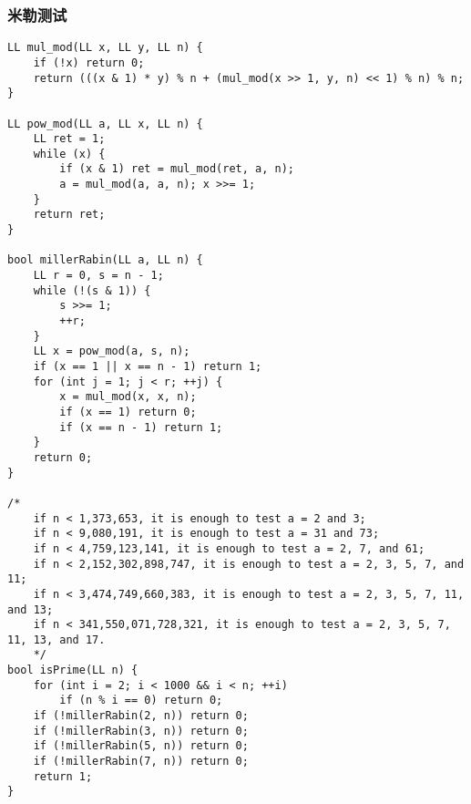 \subsubsection{米勒测试}
\begin{verbatim}
LL mul_mod(LL x, LL y, LL n) {
    if (!x) return 0;
    return (((x & 1) * y) % n + (mul_mod(x >> 1, y, n) << 1) % n) % n;
}

LL pow_mod(LL a, LL x, LL n) {
    LL ret = 1;
    while (x) {
        if (x & 1) ret = mul_mod(ret, a, n);
        a = mul_mod(a, a, n); x >>= 1;
    }
    return ret;
}

bool millerRabin(LL a, LL n) {
    LL r = 0, s = n - 1;
    while (!(s & 1)) {
        s >>= 1;
        ++r;
    }
    LL x = pow_mod(a, s, n);
    if (x == 1 || x == n - 1) return 1;
    for (int j = 1; j < r; ++j) {
        x = mul_mod(x, x, n);
        if (x == 1) return 0;
        if (x == n - 1) return 1;
    }
    return 0;
}

/*
    if n < 1,373,653, it is enough to test a = 2 and 3;
    if n < 9,080,191, it is enough to test a = 31 and 73;
    if n < 4,759,123,141, it is enough to test a = 2, 7, and 61;
    if n < 2,152,302,898,747, it is enough to test a = 2, 3, 5, 7, and 11;
    if n < 3,474,749,660,383, it is enough to test a = 2, 3, 5, 7, 11, and 13;
    if n < 341,550,071,728,321, it is enough to test a = 2, 3, 5, 7, 11, 13, and 17.
    */
bool isPrime(LL n) {
    for (int i = 2; i < 1000 && i < n; ++i)
        if (n % i == 0) return 0;
    if (!millerRabin(2, n)) return 0;
    if (!millerRabin(3, n)) return 0;
    if (!millerRabin(5, n)) return 0;
    if (!millerRabin(7, n)) return 0;
    return 1;
}
\end{verbatim}
